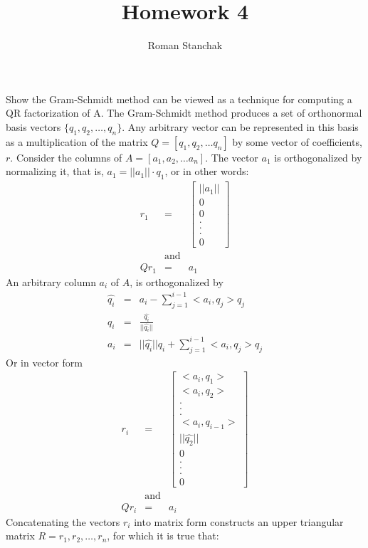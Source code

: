 \documentclass{article}
\author{Roman Stanchak}
\title{Homework 4}
\newcommand{\ea}[1]{\begin{eqnarray*}#1\end{eqnarray*}}
\newcommand{\mat}[2]{\left[\begin{array}{#1}#2\end{array}\right]}
\begin{document}

\maketitle
 Show the Gram-Schmidt method can be viewed as a technique for 
computing a QR factorization of A.
 The Gram-Schmidt method produces a set of orthonormal basis vectors
$\{q_1, q_2, \dots, q_n\}$.  Any arbitrary vector can be represented in this 
basis as a multiplication of the matrix $Q=[q_1, q_2, \dots q_n]$ by some vector
of coefficients, $r$.  Consider the columns of $A=[a_1, a_2,\dots a_n]$.  
The vector $a_1$ is orthogonalized by normalizing it, that is, 
$a_1=||a_1||\cdot q_1$, or in other words:
\ea{ r_1 &=& \mat{c}{||a_1||\\0\\0\\.\\.\\.\\0} \\
	&\mbox{and}& \\
     Qr_1 &=& a_1 
}
An arbitrary column $a_i$ of $A$, is orthogonalized by 
\ea{ \hat{q_i}&=& a_i-\sum_{j=1}^{i-1} <a_i,q_j>q_j \\
     q_i &=& \frac{\hat{q_i}}{||\hat{q_i}||} \\
	 a_i &=& ||\hat{q_i}||q_i + \sum_{j=1}^{i-1} <a_i,q_j>q_j
}
Or in vector form
\ea{ r_i &=& \mat{c}{
			<a_i,q_1>\\
			<a_i,q_2>\\
			.\\.\\.\\
			<a_i,q_{i-1}>\\
			||\hat{q_2}||\\
			0\\.\\.\\.\\0
		}\\ 
	&\mbox{and}& \\
     Qr_i &=& a_i
}
Concatenating the vectors $r_i$ into matrix form constructs
an upper triangular matrix $R={r_1,r_2,\dots,r_n}$, for which it is true that:
\end{document}
